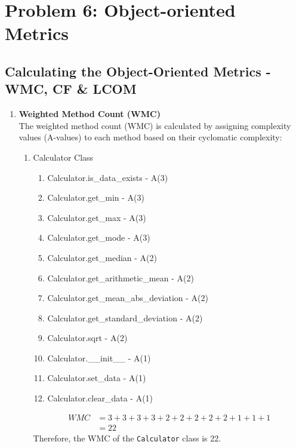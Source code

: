 \section{Problem 6: Object-oriented Metrics}

\subsection{Calculating the Object-Oriented Metrics - WMC, CF \& LCOM}

\begin{enumerate}
\item \textbf{Weighted Method Count (WMC)}\\
The weighted method count (WMC) is calculated by assigning complexity values (A-values) to each method based on their cyclomatic complexity:
\begin{enumerate}
    \item Calculator Class\\
    \begin{enumerate}
         \item Calculator.is\_data\_exists - A(3)
         \item Calculator.get\_min - A(3)
         \item Calculator.get\_max - A(3)
         \item Calculator.get\_mode - A(3)
         \item Calculator.get\_median - A(2)
         \item Calculator.get\_arithmetic\_mean - A(2)
         \item Calculator.get\_mean\_abs\_deviation - A(2)
         \item Calculator.get\_standard\_deviation - A(2)
         \item Calculator.sqrt - A(2)
         \item Calculator.\_\_init\_\_ - A(1)
         \item Calculator.set\_data - A(1)
         \item Calculator.clear\_data - A(1)
    \end{enumerate}
    \vspace{12pt}
    \begin{align}
        WMC     &= 3 + 3 + 3 + 3 + 2 + 2 + 2 + 2 + 2 + 1 + 1 + 1 \\
                &= 22
    \end{align}
    Therefore, the WMC of the \texttt{Calculator} class is 22.\\


\end{enumerate}
\end{enumerate}
